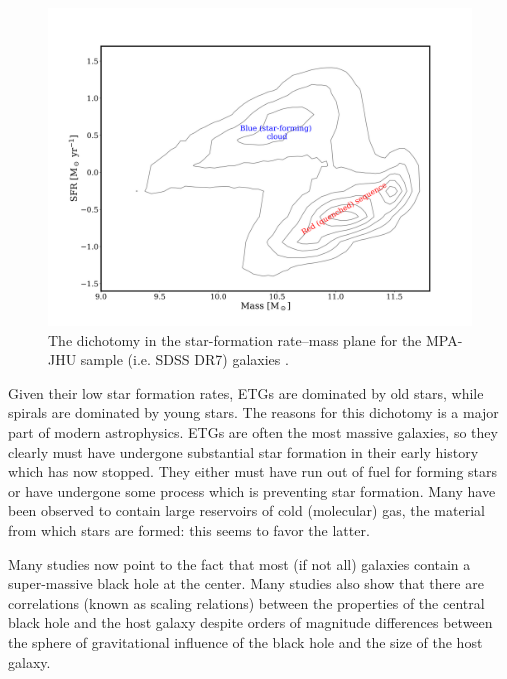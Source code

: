 \begin{figure}
	\centering
	\includegraphics[width=\textwidth]{introduction/sfMass.png}
	\caption[Star-formation rate--Mass diagram]{The dichotomy in the star-formation rate--mass plane for the MPA-JHU sample (i.e. SDSS DR7) galaxies \citep{Kauffmann2003, Brinchmann2003, Salim2007}.}
	\label{fig:colorMass}
\end{figure}

Given their low star formation rates, ETGs are dominated by old stars, while spirals are dominated by young stars. The reasons for this dichotomy is a major part of modern astrophysics. ETGs are often the most massive galaxies, so they clearly must have undergone substantial star formation in their early history which has now stopped. They either must have run out of fuel for forming stars or have undergone some process which is preventing star formation. Many have been observed to contain large reservoirs of cold (molecular) gas, the material from which stars are formed: this seems to favor the latter. 

Many studies now point to the fact that most (if not all) galaxies contain a super-massive black hole at the center. Many studies also show that there are correlations (known as scaling relations) between the properties of the central black hole and the host galaxy despite orders of magnitude differences between the sphere of gravitational influence of the black hole and the size of the host galaxy. 


